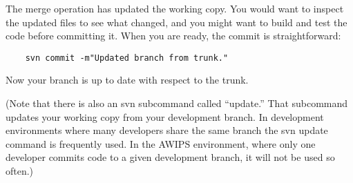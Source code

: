 The merge operation has updated the working copy.  You would want to
inspect the updated files to see what changed, and you might want to
build and test the code before committing it.  When you are ready, the
commit is straightforward:
\begin{verbatim}
    svn commit -m"Updated branch from trunk."
\end{verbatim}
Now your branch is up to date with respect to the trunk.

(Note that there is also an svn subcommand called ``update.''  That
subcommand updates your working copy from your development branch.
In development environments where many developers share the same
branch the svn update command is frequently used.  In the AWIPS
environment, where only one developer commits code to a given 
development branch, it will not be used so often.)


